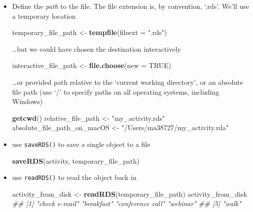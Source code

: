 \documentclass[]{book}
\newenvironment{Shaded}{\begin{snugshade}}{\end{snugshade}}
\newcommand{\CommentTok}[1]{\textcolor[rgb]{0.56,0.35,0.01}{\textit{#1}}}
\newcommand{\DataTypeTok}[1]{\textcolor[rgb]{0.13,0.29,0.53}{#1}}
\newcommand{\KeywordTok}[1]{\textcolor[rgb]{0.13,0.29,0.53}{\textbf{#1}}}
\newcommand{\NormalTok}[1]{#1}
\newcommand{\OtherTok}[1]{\textcolor[rgb]{0.56,0.35,0.01}{#1}}
\newcommand{\StringTok}[1]{\textcolor[rgb]{0.31,0.60,0.02}{#1}}
\begin{document}
\begin{itemize}
\item
  Define the \emph{path} to the file. The file extension is, by convention, `.rds'. We'll use a temporary location

\begin{Shaded}
\begin{Highlighting}[]
\NormalTok{temporary_file_path <-}\StringTok{ }\KeywordTok{tempfile}\NormalTok{(}\DataTypeTok{fileext =} \StringTok{".rds"}\NormalTok{)}
\end{Highlighting}
\end{Shaded}

  \ldots{}but we could have chosen the destination interactively

\begin{Shaded}
\begin{Highlighting}[]
\NormalTok{interactive_file_path <-}\StringTok{ }\KeywordTok{file.choose}\NormalTok{(}\DataTypeTok{new =} \OtherTok{TRUE}\NormalTok{)}
\end{Highlighting}
\end{Shaded}

  \ldots{}or provided path relative to the `current working directory', or an absolute file path (use `/' to specify paths on all operating systems, including Windows)

\begin{Shaded}
\begin{Highlighting}[]
\KeywordTok{getcwd}\NormalTok{()}
\NormalTok{relative_file_path <-}\StringTok{ "my_activity.rds"}
\NormalTok{absolute_file_path_on_macOS <-}\StringTok{ "/Users/ma38727/my_activity.rda"}
\end{Highlighting}
\end{Shaded}
\item
  use \texttt{saveRDS()} to save a single object to a file

\begin{Shaded}
\begin{Highlighting}[]
\KeywordTok{saveRDS}\NormalTok{(activity, temporary_file_path)}
\end{Highlighting}
\end{Shaded}
\item
  use \texttt{readRDS()} to read the object back in

\begin{Shaded}
\begin{Highlighting}[]
\NormalTok{activity_from_disk <-}\StringTok{ }\KeywordTok{readRDS}\NormalTok{(temporary_file_path)}
\NormalTok{activity_from_disk}
\CommentTok{## [1] "check e-mail"    "breakfast"       "conference call" "webinar"        }
\CommentTok{## [5] "walk"}
\end{Highlighting}
\end{Shaded}
\end{itemize}
\end{document}

